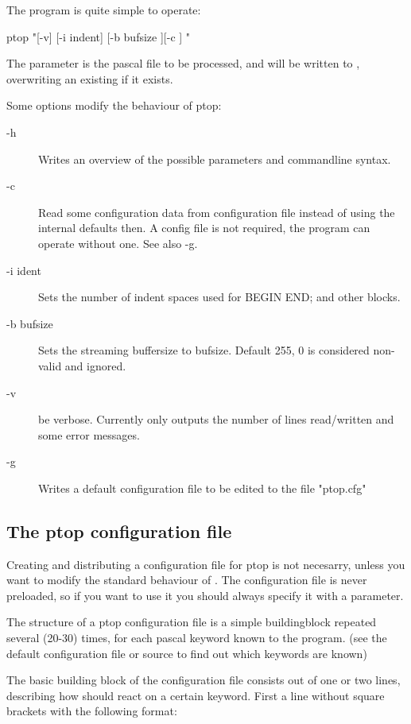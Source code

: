 The program is quite simple to operate:

ptop "[-v] [-i indent] [-b bufsize ][-c ]  "

The  parameter is the pascal file to be processed, and will be written
to , overwriting an existing  if it exists.

Some options modify the behaviour of ptop:

\begin{description}
\item[-h] Writes an overview of the possible parameters and commandline syntax.
\item[-c ] Read some configuration data from configuration file instead of using
  the internal defaults then. A config file is not required, the program can
  operate without one. See also -g.
\item[-i ident] Sets the number of indent spaces used for BEGIN END; and other blocks.
\item[-b bufsize] Sets the streaming buffersize to bufsize. Default 255, 0 is considered non-valid and ignored.
\item[-v] be verbose. Currently only outputs the number of lines read/written and some error messages.
\item[-g ] Writes a default configuration file to be edited to the file "ptop.cfg"
\end{description}

\subsection{The ptop configuration file}

Creating and distributing a configuration file for ptop is not necesarry,
unless you want to modify the standard behaviour of . The configuration
file is never preloaded, so if you want to use it you should always specify
it with a  parameter.

The structure of a ptop configuration file is a simple buildingblock repeated
several (20-30) times, for each pascal keyword known to the  program.
(see the default configuration file or  source to
find out which keywords are known)

The basic building block of the configuration file consists out of one or two
lines, describing how  should react on a certain keyword.
First a line without square brackets with the following format:

